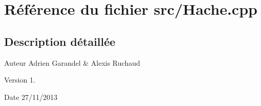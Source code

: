 \section{Référence du fichier src/\-Hache.cpp}
\label{_hache_8cpp}


\subsection{Description détaillée}
\begin{DoxyAuthor}{Auteur}
Adrien Garandel \& Alexis Ruchaud 
\end{DoxyAuthor}
\begin{DoxyVersion}{Version}
1. 
\end{DoxyVersion}
\begin{DoxyDate}{Date}
27/11/2013 
\end{DoxyDate}
